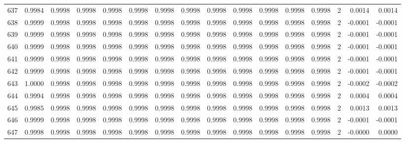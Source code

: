 \begin{tabular}{lrrrrrrrrrrrrrrr}
637 &      0.9984 &  0.9998 &  0.9998 &  0.9998 &  0.9998 &  0.9998 &  0.9998 &  0.9998 &  0.9998 &  0.9998 &   0.9998 &     0.9998 &      2 &                    0.0014 &                     0.0014 \\
638 &      0.9999 &  0.9998 &  0.9998 &  0.9998 &  0.9998 &  0.9998 &  0.9998 &  0.9998 &  0.9998 &  0.9998 &   0.9998 &     0.9998 &      2 &                   -0.0001 &                    -0.0001 \\
639 &      0.9999 &  0.9998 &  0.9998 &  0.9998 &  0.9998 &  0.9998 &  0.9998 &  0.9998 &  0.9998 &  0.9998 &   0.9998 &     0.9998 &      2 &                   -0.0001 &                    -0.0001 \\
640 &      0.9999 &  0.9998 &  0.9998 &  0.9998 &  0.9998 &  0.9998 &  0.9998 &  0.9998 &  0.9998 &  0.9998 &   0.9998 &     0.9998 &      2 &                   -0.0001 &                    -0.0001 \\
641 &      0.9999 &  0.9998 &  0.9998 &  0.9998 &  0.9998 &  0.9998 &  0.9998 &  0.9998 &  0.9998 &  0.9998 &   0.9998 &     0.9998 &      2 &                   -0.0001 &                    -0.0001 \\
642 &      0.9999 &  0.9998 &  0.9998 &  0.9998 &  0.9998 &  0.9998 &  0.9998 &  0.9998 &  0.9998 &  0.9998 &   0.9998 &     0.9998 &      2 &                   -0.0001 &                    -0.0001 \\
643 &      1.0000 &  0.9998 &  0.9998 &  0.9998 &  0.9998 &  0.9998 &  0.9998 &  0.9998 &  0.9998 &  0.9998 &   0.9998 &     0.9998 &      2 &                   -0.0002 &                    -0.0002 \\
644 &      0.9994 &  0.9998 &  0.9998 &  0.9998 &  0.9998 &  0.9998 &  0.9998 &  0.9998 &  0.9998 &  0.9998 &   0.9998 &     0.9998 &      2 &                    0.0004 &                     0.0004 \\
645 &      0.9985 &  0.9998 &  0.9998 &  0.9998 &  0.9998 &  0.9998 &  0.9998 &  0.9998 &  0.9998 &  0.9998 &   0.9998 &     0.9998 &      2 &                    0.0013 &                     0.0013 \\
646 &      0.9999 &  0.9998 &  0.9998 &  0.9998 &  0.9998 &  0.9998 &  0.9998 &  0.9998 &  0.9998 &  0.9998 &   0.9998 &     0.9998 &      2 &                   -0.0001 &                    -0.0001 \\
647 &      0.9998 &  0.9998 &  0.9998 &  0.9998 &  0.9998 &  0.9998 &  0.9998 &  0.9998 &  0.9998 &  0.9998 &   0.9998 &     0.9998 &      2 &                   -0.0000 &                     0.0000 \\

\end{tabular}
